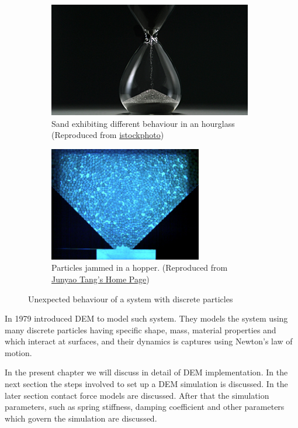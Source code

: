 \begin{figure}[h]
  \begin{subfigure}{0.5\textwidth}
    \includegraphics[width=0.9\linewidth, height=5cm]{dem/doc_images/hourglass}
    \caption{Sand exhibiting different behaviour in an hourglass (Reproduced from \href{https://www.istockphoto.com/in/videos/hourglass?sort=mostpopular&offlinecontent=include&phrase=hourglass}{istockphoto})}
    \label{fig:hourglass}
  \end{subfigure}
  \begin{subfigure}{0.5\textwidth}
    \includegraphics[width=0.9\linewidth, height=5cm]{dem/doc_images/hopper_jam}
    \caption{Particles jammed in a hopper. (Reproduced from
      \href{http://webhome.phy.duke.edu/~jt41/research.html}{Junyao Tang's Home
    Page})}
    \label{fig:hopper_jam}
  \end{subfigure}

  \caption{Unexpected behaviour of a system with discrete particles}
  \label{fig:dem_introduction}
\end{figure}

In 1979 \citeauthor{Cundall_1979} introduced DEM to model such system. They
models the system using many discrete particles having specific shape, mass,
material properties and which interact at surfaces, and their dynamics is
captures using Newton's law of motion.

In the present chapter we will discuss in detail of DEM implementation. In the
next section the steps involved to set up a DEM simulation is discussed. In the
later section contact force models are discussed. After that the simulation
parameters, such as spring stiffness, damping coefficient and other parameters
which govern the simulation are discussed.


